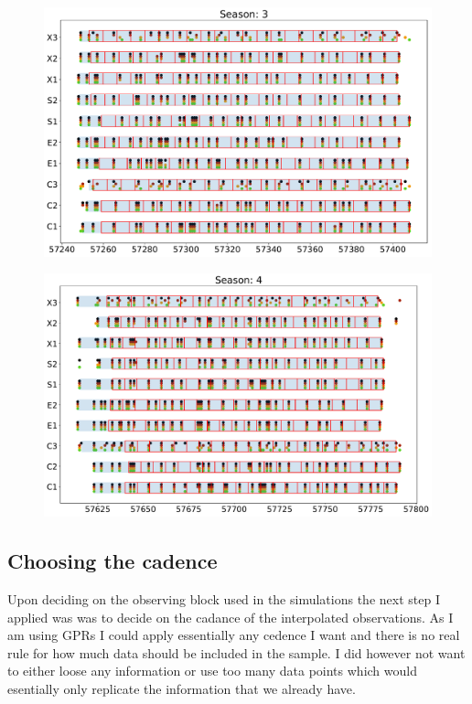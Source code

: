 \begin{figure}[h]
\includegraphics[width=\textwidth]{Figures/Chapter5/ObsBlock_Season3.pdf}
  \caption{}
  \label{fig:ObsBlock3}
\end{figure}

\begin{figure}[h]
  \includegraphics[width=\textwidth]{Figures/Chapter5/ObsBlock_Season4.pdf}
  \caption{}
  \label{fig:ObsBlock4}
\end{figure}

\subsection{Choosing the cadence} \label{sec:SimCadance}
Upon deciding on the observing block used in the simulations the next step I applied was was to decide on the cadance of the interpolated observations. As I am using GPRs I could apply essentially any cedence I want and there is no real rule for how much data should be included in the sample. I did however not want to either loose any information or use too many data points which would esentially only replicate the information that we already have.


